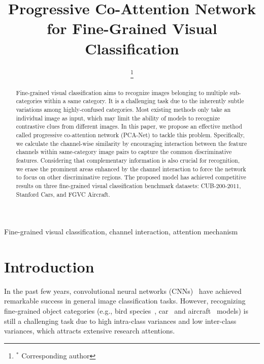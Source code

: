 \documentclass[conference]{IEEEtran}
\begin{document}
\title{Progressive Co-Attention Network for Fine-Grained Visual Classification}



\author{
\thanks{$^*$ Corresponding author}
}


\maketitle

\begin{abstract}
Fine-grained visual classification aims to recognize images belonging to multiple sub-categories within a same category. It is a challenging task due to the inherently subtle variations among highly-confused categories. Most existing methods only take an individual image as input, which may limit the ability of models to recognize contrastive clues from different images. In this paper, we propose an effective method called progressive co-attention network (PCA-Net) to tackle this problem. Specifically, we calculate the channel-wise similarity by encouraging interaction between the feature channels within same-category image pairs to capture the common discriminative features. Considering that complementary information is also crucial for recognition, we erase the prominent areas enhanced by the channel interaction to force the network to focus on other discriminative regions. The proposed model has achieved competitive results on three fine-grained visual classification benchmark datasets: CUB-$200$-$2011$, Stanford Cars, and FGVC Aircraft. 
\end{abstract}

\begin{IEEEkeywords}
Fine-grained visual classification, channel interaction, attention mechanism
\end{IEEEkeywords}

\section{Introduction}
In the past few years, convolutional neural networks (CNNs)~\cite{krizhevsky2012classification,Simonyan2014recognition,szegedy2015going,he2016deep} have achieved remarkable success in general image classification tasks. However, recognizing fine-grained object categories (e.g., bird species~\cite{wah2011caltech}, car~\cite{krause20133d} and aircraft~\cite{maji13fine} models) is still a challenging task due to high intra-class variances and low inter-class variances, which attracts extensive research attentions. 
\end{document}
